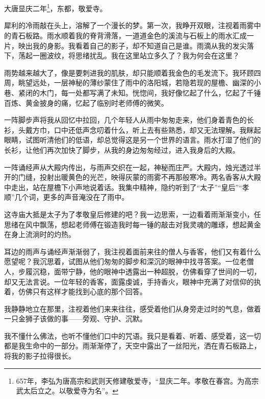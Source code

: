 \documentclass[UTF8,openany]{ctexbook}
\begin{document}
\begin{center}
    ~\\[0.5em]
    \\[2em]
\end{center}    

大唐显庆二年\footnote{657年，李弘为唐高宗和武则天修建敬爱寺，“显庆二年。孝敬在春宫。为高宗武太后立之。以敬爱寺为名”\cite{bi:thy}。}，东都，敬爱寺。

犀利的冷雨敲在头上，溶解了一个漫长的梦。第一次，我睁开双眼，注视着雨雾中的青石板路。雨水顺着我的脊背滑落，一道道金色的溪流与石板上的雨水汇成一片，映出我的身影。我看着自己的影子，却不知道自己是谁。雨滴从我的发尖落下，荡起一圈波纹，将思绪扰乱。我在这里站立多久了？我为何会在这里？

雨势越来越大了，像是要刺进我的肌肤，却只能顺着我金色的毛发流下。我环顾四周，眺望远处，一层神秘的薄纱蒙住了雨中的洛阳城，若隐若现的屋檐、幽深的小巷、紧闭的木门，每一处都写满了未知。恍惚间，我好像忆起了什么，忆起了千锤百炼、黄金披身的痛，忆起了临别时老师傅的微笑。

一阵脚步声将我从回忆中拉回，几个年轻人从雨中匆匆走来，他们身着青色的长衫，头戴方巾，口中还低声念叨着什么，听上去有些熟悉，却又无法理解。我眯起眼睛，试图听清他们的低语，却总觉得这是另一个世界的语言。雨水打湿了他们的长衫，让他们再次加快了脚步，从我的身边匆匆经过，进入我身后的大殿。

一阵诵经声从大殿内传出，与雨声交织在一起，神秘而庄严。大殿内，烛光透过半开的门缝，投射出暖黄色的光芒，映得灰蒙的雨雾不再那般寒冷。两名香客从大殿中走出，站在屋檐下小声地说着话。我集中精神，隐约听到了“太子”“皇后”“孝顺”几个词，更多的声音淹没在了雨中。

这寺庙大抵是太子为了孝敬皇后修建的吧？我一边思索，一边看着雨渐渐变小，任思绪在风中飘荡，想起老师傅在锻造我时每一锤的敲击对我灵魂的雕琢，想起黄金在身上流淌时的灼热。

耳边的雨声与诵经声渐渐弱了，我注视着面前来往的僧人与香客，他们又有着什么愿望呢？我沉思着，试图从他们匆匆的脚步和深沉的眼神中找寻答案。一位老僧人，步履沉稳，面带宁静，他的眼神中透露出一种超脱，仿佛看穿了世间的一切，却又无法言说。一位年轻的香客，面露虔诚，手持香火，眼神中充满了对信仰的执着，仿佛只有这样才能找到心底的那个回答。

我静静地立在那里，注视着他们来来往往，感受着他们从身旁走过时的气息，做着一只金狮子该做的事——旁观、守护、沉默。

我不懂什么佛法，也听不懂他们口中的咒语。我只是看着、听着、感受着，这一切都是我生命中的一部分。雨渐渐停了，天空中露出了一丝阳光，洒在青石板路上，将我的影子拉得很长。
\end{document}
